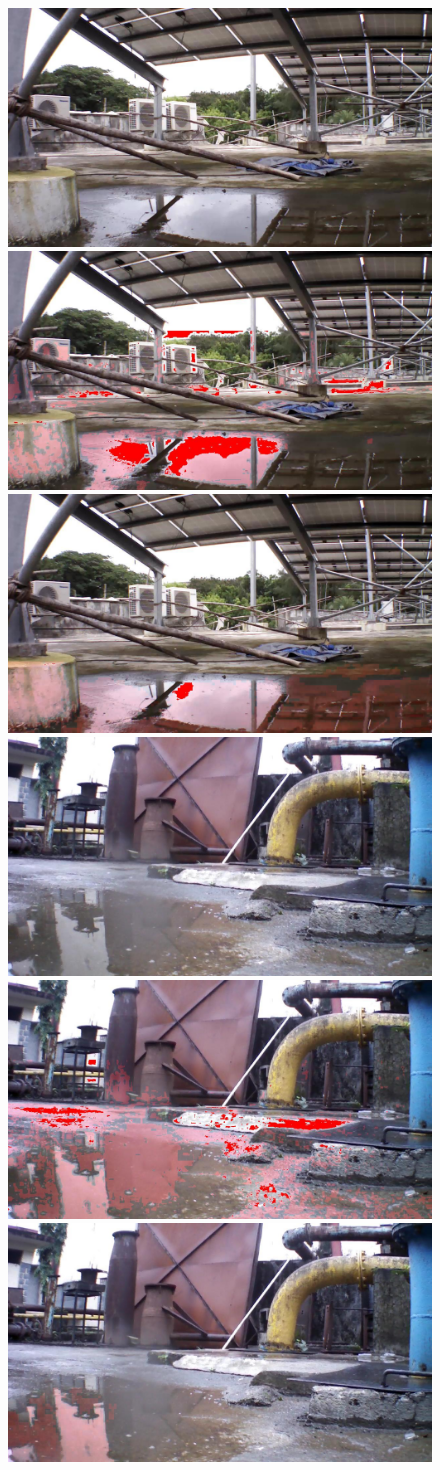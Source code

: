 \documentclass[times,10pt,twocolumn,letterpaper]{article}
\begin{document}
\begin{figure}
\includegraphics[width=0.31\linewidth]{images/results/dataset_81/IMG_PAIR_1_1.jpg}
\includegraphics[width=0.31\linewidth]{images/results/dataset_81/output_1_jpl2.jpg}
\includegraphics[width=0.31\linewidth]{images/results/dataset_81/output_1.jpg}\\

\includegraphics[width=0.31\linewidth]{images/results/dataset_82/IMG_PAIR_192_1.jpg}
\includegraphics[width=0.31\linewidth]{images/results/dataset_82/output_192_jpl2.jpg}
\includegraphics[width=0.31\linewidth]{images/results/dataset_82/output_192.jpg}\\
	

\end{figure}
\end{document}
